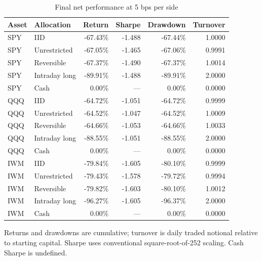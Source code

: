 \begin{table}[!htbp]\centering\small\setlength{\tabcolsep}{10pt}
\caption{Final net performance at 5 bps per side}\label{tab:economics}
\begin{tabular}{llrrrr}\toprule
Asset & Allocation & Return & Sharpe & Drawdown & Turnover\\\midrule
SPY & IID & -67.43\% & -1.488 & -67.44\% & 1.0000\\
SPY & Unrestricted & -67.05\% & -1.465 & -67.06\% & 0.9991\\
SPY & Reversible & -67.37\% & -1.490 & -67.37\% & 1.0014\\
SPY & Intraday long & -89.91\% & -1.488 & -89.91\% & 2.0000\\
SPY & Cash & 0.00\% & --- & 0.00\% & 0.0000\\
QQQ & IID & -64.72\% & -1.051 & -64.72\% & 0.9999\\
QQQ & Unrestricted & -64.52\% & -1.047 & -64.52\% & 1.0009\\
QQQ & Reversible & -64.66\% & -1.053 & -64.66\% & 1.0033\\
QQQ & Intraday long & -88.55\% & -1.051 & -88.55\% & 2.0000\\
QQQ & Cash & 0.00\% & --- & 0.00\% & 0.0000\\
IWM & IID & -79.84\% & -1.605 & -80.10\% & 0.9999\\
IWM & Unrestricted & -79.43\% & -1.578 & -79.72\% & 0.9994\\
IWM & Reversible & -79.82\% & -1.603 & -80.10\% & 1.0012\\
IWM & Intraday long & -96.27\% & -1.605 & -96.37\% & 2.0000\\
IWM & Cash & 0.00\% & --- & 0.00\% & 0.0000\\
\bottomrule\end{tabular}
\par\smallskip\parbox{0.98\linewidth}{\footnotesize Returns and drawdowns are cumulative; turnover is daily traded notional relative to starting capital. Sharpe uses conventional square-root-of-252 scaling. Cash Sharpe is undefined.}
\end{table}

